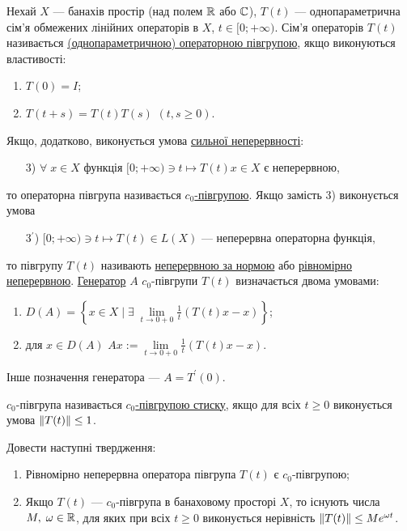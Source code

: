 
\begin{theory}
    Нехай $X$ --- банахів простір (над полем $\mathbb{R}$ або $\mathbb{C}$),
    $T(t)$ --- однопараметрична сім'я обмежених лінійних операторів в $X$, $t \in [0; +\infty)$.
    Сім'я операторів $T(t)$ називається \uline{(однопараметричною) операторною півгрупою}, якщо
    виконуються властивості:
    \begin{enumerate}[label = \arabic*)]
        \item $T(0) = I$;
        \item $T(t+s) = T(t) T(s)$ $(t, s \geq 0)$.
    \end{enumerate}
    Якщо, додатково, виконується умова \uline{сильної неперервності}:
    \begin{enumerate}[label = \arabic*)]
        \item[3)] $\forall \; x \in X$ функція $[0; +\infty) \ni t \mapsto T(t)x \in X$ є неперервною,
    \end{enumerate}
    то операторна півгрупа називається \uline{$c_0$-півгрупою}.
    Якщо замість 3) виконується умова 
    \begin{enumerate}[label = \arabic*)]
        \item[3$^\prime$)] $[0; +\infty) \ni t \mapsto T(t) \in L(X)$ --- неперервна операторна функція,
    \end{enumerate} 
    то півгрупу $T(t)$ називають \uline{неперервною за нормою} або
    \ul{рівномірно неперервною}.
    \noindent\uline{Генератор} $A$ $c_0$-півгрупи $T(t)$ визначається двома умовами:
    \begin{enumerate}
        \item $D(A) = \left\{ x \in X \mid \exists \; \underset{t\to 0+0}{\lim} \frac{1}{t} (T(t)x - x)\right\}$;
        \item для $x \in D(A)$ $Ax := \underset{t\to 0+0}{\lim} \frac{1}{t} (T(t)x - x)$.
    \end{enumerate}
    Інше позначення генератора --- $A = T^\prime (0)$.

    \noindent $c_0$-півгрупа називається \uline{$c_0$-півгрупою стиску},
    якщо для всіх $t \geq 0$ виконується умова $\left\lVert T(t)\right\rVert \leq 1$.
\end{theory}

\begin{exercise}
    Довести наступні твердження:
    \begin{enumerate}
        \item Рівномірно неперервна оператора півгрупа $T(t)$ є $c_0$-півгрупою;
        \item Якщо $T(t)$ --- $c_0$-півгрупа в банаховому просторі $X$, то існують числа $M, \; \omega \in \mathbb{R}$,
        для яких при всіх $t \geq 0$ виконується нерівність $\left\lVert T(t)\right\rVert \leq M e^{\omega t}$.
    \end{enumerate}
\end{exercise}

